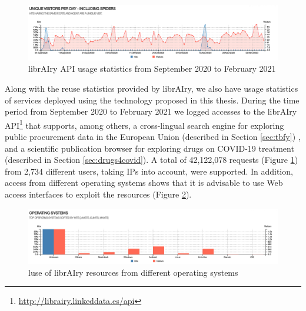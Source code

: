 \begin{figure}[ht]
    \centering
    \includegraphics[width=0.7\linewidth]{usage-statistics.png}
    \caption{librAIry API usage statistics from September 2020 to February 2021}
    \label{fig:api-usage}
\end{figure}


Along with the reuse statistics provided by librAIry, we also have usage statistics of services deployed using the technology proposed in this thesis. During the time period from September 2020 to February 2021 we logged accesses to the librAIry API\footnote{\url{http://librairy.linkeddata.es/api}} that supports, among others, a cross-lingual search engine for exploring public procurement data in the European Union (described in Section \ref{sec:tbfy}) , and a scientific publication browser for exploring drugs on COVID-19 treatment  (described in Section \ref{sec:drugs4covid}).  A total of 42,122,078 requests (Figure \ref{fig:api-usage}) from 2,734 different users, taking IPs into account, were supported. In addition, access from different operating systems shows that it is advisable to use Web access interfaces to exploit the resources (Figure \ref{fig:so-usage}).


\begin{figure}[ht]
    \centering
    \includegraphics[width=0.7\linewidth]{so-statistics.png}
    \caption{luse of librAIry resources from different operating systems}
    \label{fig:so-usage}
\end{figure}



